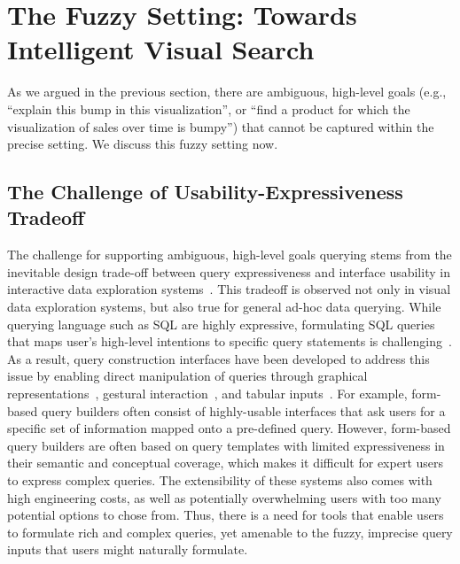 \section{The Fuzzy Setting: Towards Intelligent Visual Search}\label{sec:vague}
\par As we argued in the previous section, 
there are ambiguous, high-level goals (e.g., 
``explain this bump in this visualization'', or ``find a product
for which the visualization of sales over time is bumpy'') that
cannot be captured within the precise setting. 
We discuss this fuzzy setting now. 


\subsection{The Challenge of Usability-Expressiveness Tradeoff}
\par The challenge for supporting ambiguous, 
high-level goals querying stems from the 
inevitable design trade-off between 
query expressiveness and interface 
usability in interactive data exploration 
systems~\cite{Jagadish2007,Morton2014}. 
This tradeoff is observed not only in 
visual data exploration systems, 
but also true for general ad-hoc data querying. 
While querying language such as SQL are highly expressive, 
formulating SQL queries that maps user's high-level intentions 
to specific query statements is challenging~\cite{Jagadish2007,Khoussainova2010}. 
As a result, query construction interfaces 
have been developed to address this issue by enabling 
direct manipulation of queries through 
graphical representations~\cite{Abouzied2012}, 
gestural interaction~\cite{Nandi2013}, and 
tabular inputs~\cite{Zloof1975,Embley1989}. 
For example, form-based query builders 
often consist of highly-usable interfaces 
that ask users for a specific set of information 
mapped onto a pre-defined query. 
However, form-based query builders 
are often based on query templates 
with limited expressiveness 
in their semantic and conceptual coverage, 
which makes it difficult for expert users 
to express complex queries. 
The extensibility of these systems 
also comes with high engineering costs, 
as well as potentially overwhelming users 
with too many potential options to chose from. 
Thus, there is a need for tools that enable users 
to formulate rich and complex queries, 
yet amenable to the fuzzy, imprecise query 
inputs that users might naturally formulate. 

